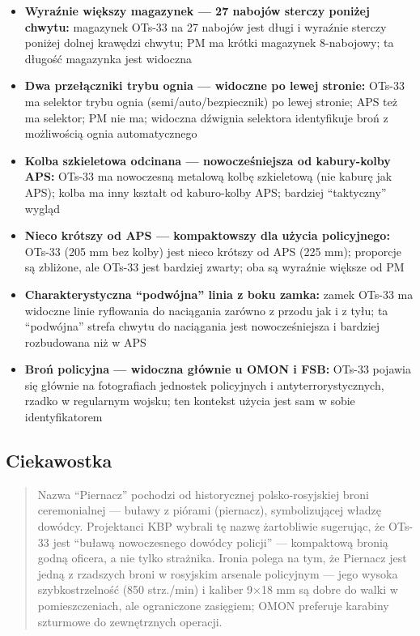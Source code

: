 \documentclass[12pt,oneside]{book}
\providecommand{\tightlist}{%
  \setlength{\itemsep}{0pt}\setlength{\parskip}{0pt}}
\begin{document}
\begin{itemize}
\tightlist
\item
  \textbf{Wyraźnie większy magazynek --- 27 nabojów sterczy poniżej
  chwytu:} magazynek OTs-33 na 27 nabojów jest długi i wyraźnie sterczy
  poniżej dolnej krawędzi chwytu; PM ma krótki magazynek 8-nabojowy; ta
  długość magazynka jest widoczna
\item
  \textbf{Dwa przełączniki trybu ognia --- widoczne po lewej stronie:}
  OTs-33 ma selektor trybu ognia (semi/auto/bezpiecznik) po lewej
  stronie; APS też ma selektor; PM nie ma; widoczna dźwignia selektora
  identyfikuje broń z możliwością ognia automatycznego
\item
  \textbf{Kolba szkieletowa odcinana --- nowocześniejsza od kabury-kolby
  APS:} OTs-33 ma nowoczesną metalową kolbę szkieletową (nie kaburę jak
  APS); kolba ma inny kształt od kaburo-kolby APS; bardziej
  ``taktyczny'' wygląd
\item
  \textbf{Nieco krótszy od APS --- kompaktowszy dla użycia policyjnego:}
  OTs-33 (205 mm bez kolby) jest nieco krótszy od APS (225 mm);
  proporcje są zbliżone, ale OTs-33 jest bardziej zwarty; oba są
  wyraźnie większe od PM
\item
  \textbf{Charakterystyczna ``podwójna'' linia z boku zamka:} zamek
  OTs-33 ma widoczne linie ryflowania do naciągania zarówno z przodu jak
  i z tyłu; ta ``podwójna'' strefa chwytu do naciągania jest
  nowocześ­niejsza i bardziej rozbudowana niż w APS
\item
  \textbf{Broń policyjna --- widoczna głównie u OMON i FSB:} OTs-33
  pojawia się głównie na fotografiach jednostek policyjnych i
  antyterrorystycznych, rzadko w regularnym wojsku; ten kontekst użycia
  jest sam w sobie identyfikatorem
\end{itemize}

\subsection{Ciekawostka}\label{ciekawostka-109}

\begin{quote}
Nazwa ``Piernacz'' pochodzi od historycznej polsko-rosyjskiej broni
ceremonialnej --- buławy z piórami (piernacz), symbolizującej władzę
dowódcy. Projektanci KBP wybrali tę nazwę żartobliwie sugerując, że
OTs-33 jest ``buławą nowoczesnego dowódcy policji'' --- kompaktową
bronią godną oficera, a nie tylko strażnika. Ironia polega na tym, że
Piernacz jest jedną z rzadszych broni w rosyjskim arsenale policyjnym
--- jego wysoka szybkostrzelność (850 strz./min) i kaliber 9×18 mm są
dobre do walki w pomieszczeniach, ale ograniczone zasięgiem; OMON
preferuje karabiny szturmowe do zewnętrznych operacji.
\end{quote}
\end{document}
